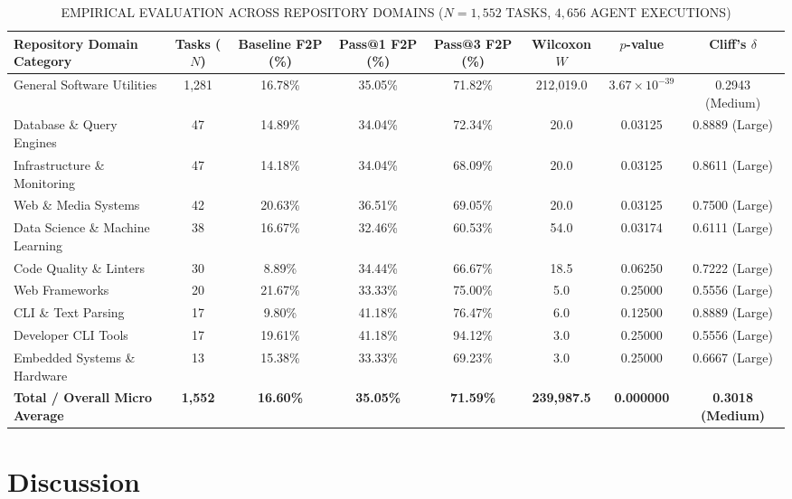 \documentclass[conference]{IEEEtran}
\begin{document}
\begin{table}[htbp]
\caption{EMPIRICAL EVALUATION ACROSS REPOSITORY DOMAINS ($N=1,552$ TASKS, $4,656$ AGENT EXECUTIONS)}
\begin{center}
\begin{tabular}{|l|c|c|c|c|c|c|c|}
\hline
\textbf{Repository Domain Category} & \textbf{Tasks ($N$)} & \textbf{Baseline F2P (\%)} & \textbf{Pass@1 F2P (\%)} & \textbf{Pass@3 F2P (\%)} & \textbf{Wilcoxon $W$} & \textbf{$p$-value} & \textbf{Cliff's $\delta$} \\
\hline
General Software Utilities & 1,281 & 16.78\% & 35.05\% & 71.82\% & 212,019.0 & $3.67 \times 10^{-39}$ & 0.2943 (Medium) \\
Database \& Query Engines & 47 & 14.89\% & 34.04\% & 72.34\% & 20.0 & 0.03125 & 0.8889 (Large) \\
Infrastructure \& Monitoring & 47 & 14.18\% & 34.04\% & 68.09\% & 20.0 & 0.03125 & 0.8611 (Large) \\
Web \& Media Systems & 42 & 20.63\% & 36.51\% & 69.05\% & 20.0 & 0.03125 & 0.7500 (Large) \\
Data Science \& Machine Learning & 38 & 16.67\% & 32.46\% & 60.53\% & 54.0 & 0.03174 & 0.6111 (Large) \\
Code Quality \& Linters & 30 & 8.89\% & 34.44\% & 66.67\% & 18.5 & 0.06250 & 0.7222 (Large) \\
Web Frameworks & 20 & 21.67\% & 33.33\% & 75.00\% & 5.0 & 0.25000 & 0.5556 (Large) \\
CLI \& Text Parsing & 17 & 9.80\% & 41.18\% & 76.47\% & 6.0 & 0.12500 & 0.8889 (Large) \\
Developer CLI Tools & 17 & 19.61\% & 41.18\% & 94.12\% & 3.0 & 0.25000 & 0.5556 (Large) \\
Embedded Systems \& Hardware & 13 & 15.38\% & 33.33\% & 69.23\% & 3.0 & 0.25000 & 0.6667 (Large) \\
\hline
\textbf{Total / Overall Micro Average} & \textbf{1,552} & \textbf{16.60\%} & \textbf{35.05\%} & \textbf{71.59\%} & \textbf{239,987.5} & \textbf{0.000000} & \textbf{0.3018 (Medium)} \\
\hline
\end{tabular}
\label{tab:domain_results}
\end{center}
\end{table}

\section{Discussion}
\label{sec:discussion}
\end{document}
